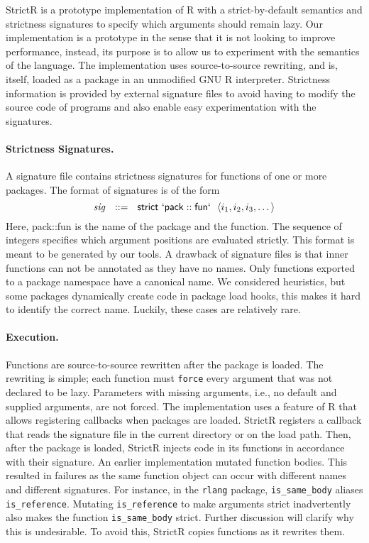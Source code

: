 \documentclass[review,screen,acmsmall]{acmart}
\renewcommand{\c}[1]{\lstinline |#1|\xspace}
\newcommand{\strictr}{{\sf StrictR}\xspace}
\begin{document}
\strictr is a prototype implementation of R with a strict-by-default semantics
and strictness signatures to specify which arguments should remain lazy. Our
implementation is a prototype in the sense that it is not looking to improve
performance, instead, its purpose is to allow us to experiment with the
semantics of the language. The implementation uses source-to-source rewriting,
and is, itself, loaded as a package in an unmodified GNU R interpreter.
Strictness information is provided by external signature files to avoid having
to modify the source code of programs and also enable easy experimentation with
the signatures.

\paragraph{Strictness Signatures.}
A signature file contains strictness signatures for functions of one or more
packages. The format of signatures is of the form
%
\[
\mathit{sig}~~::=~~\mathsf{strict}~\mathsf{`pack}::\mathsf{fun`}~~\langle i_1,
i_2, i_3, \dots\rangle
\]
%
Here, {\sf pack::fun} is the name of the package and the function. The sequence
of integers specifies which argument positions are evaluated strictly. This
format is meant to be generated by our tools. A drawback of signature files is
that inner functions can not be annotated as they have no names. Only functions
exported to a package namespace have a canonical name. We considered heuristics,
but some packages dynamically create code in package load hooks, this makes it
hard to identify the correct name. Luckily, these cases are relatively rare.

\paragraph{Execution.}
Functions are source-to-source rewritten after the package is loaded. The
rewriting is simple; each function must \c{force} every argument that was not
declared to be lazy. Parameters with missing arguments, i.e., no default and
supplied arguments, are not forced. The implementation uses a feature of R that
allows registering callbacks when packages are loaded. \strictr registers a
callback that reads the signature file in the current directory or on the load
path. Then, after the package is loaded, \strictr injects code in its functions
in accordance with their signature. An earlier implementation mutated function
bodies. This resulted in failures as the same function object can occur with
different names and different signatures. For instance, in the \c{rlang}
package, \c{is_same_body} aliases \c{is_reference}. Mutating \c{is_reference} to
make arguments strict inadvertently also makes the function \c{is_same_body}
strict. Further discussion will clarify why this is undesirable. To avoid this,
\strictr copies functions as it rewrites them.
\newpage
\end{document}

